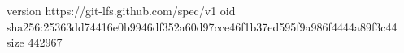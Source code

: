 version https://git-lfs.github.com/spec/v1
oid sha256:25363dd74416e0b9946df352a60d97cce46f1b37ed595f9a986f4444a89f3c44
size 442967

